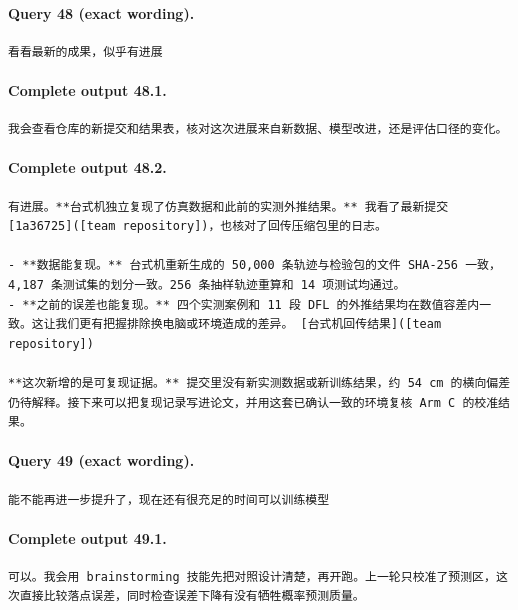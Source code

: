 \documentclass[UTF8,10pt]{ctexart}
\begin{document}
\paragraph{Query 48 (exact wording).}
\begin{Verbatim}[breaklines=true,breakanywhere=true,fontsize=\scriptsize,frame=single,framesep=2pt]
看看最新的成果，似乎有进展
\end{Verbatim}

\paragraph{Complete output 48.1.}
\begin{Verbatim}[breaklines=true,breakanywhere=true,fontsize=\scriptsize,frame=single,framesep=2pt]
我会查看仓库的新提交和结果表，核对这次进展来自新数据、模型改进，还是评估口径的变化。
\end{Verbatim}

\paragraph{Complete output 48.2.}
\begin{Verbatim}[breaklines=true,breakanywhere=true,fontsize=\scriptsize,frame=single,framesep=2pt]
有进展。**台式机独立复现了仿真数据和此前的实测外推结果。** 我看了最新提交 [1a36725]([team repository])，也核对了回传压缩包里的日志。

- **数据能复现。** 台式机重新生成的 50,000 条轨迹与检验包的文件 SHA-256 一致，4,187 条测试集的划分一致。256 条抽样轨迹重算和 14 项测试均通过。
- **之前的误差也能复现。** 四个实测案例和 11 段 DFL 的外推结果均在数值容差内一致。这让我们更有把握排除换电脑或环境造成的差异。 [台式机回传结果]([team repository])

**这次新增的是可复现证据。** 提交里没有新实测数据或新训练结果，约 54 cm 的横向偏差仍待解释。接下来可以把复现记录写进论文，并用这套已确认一致的环境复核 Arm C 的校准结果。
\end{Verbatim}

\paragraph{Query 49 (exact wording).}
\begin{Verbatim}[breaklines=true,breakanywhere=true,fontsize=\scriptsize,frame=single,framesep=2pt]
能不能再进一步提升了，现在还有很充足的时间可以训练模型
\end{Verbatim}

\paragraph{Complete output 49.1.}
\begin{Verbatim}[breaklines=true,breakanywhere=true,fontsize=\scriptsize,frame=single,framesep=2pt]
可以。我会用 brainstorming 技能先把对照设计清楚，再开跑。上一轮只校准了预测区，这次直接比较落点误差，同时检查误差下降有没有牺牲概率预测质量。
\end{Verbatim}
\end{document}
